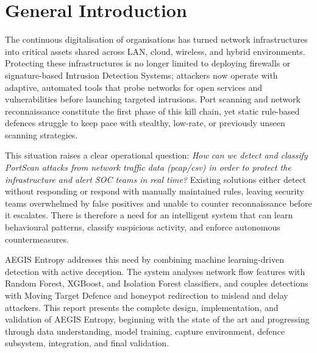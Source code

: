 \documentclass[12pt,a4paper]{report}
\begin{document}
\tableofcontents
\listoffigures
\listoftables
\newpage

\section*{General Introduction}

The continuous digitalisation of organisations has turned network infrastructures into critical assets shared across LAN, cloud, wireless, and hybrid environments. Protecting these infrastructures is no longer limited to deploying firewalls or signature-based Intrusion Detection Systems; attackers now operate with adaptive, automated tools that probe networks for open services and vulnerabilities before launching targeted intrusions. Port scanning and network reconnaissance constitute the first phase of this kill chain, yet static rule-based defences struggle to keep pace with stealthy, low-rate, or previously unseen scanning strategies.

This situation raises a clear operational question: \textit{How can we detect and classify PortScan attacks from network traffic data (pcap/csv) in order to protect the infrastructure and alert SOC teams in real time?} Existing solutions either detect without responding or respond with manually maintained rules, leaving security teams overwhelmed by false positives and unable to counter reconnaissance before it escalates. There is therefore a need for an intelligent system that can learn behavioural patterns, classify suspicious activity, and enforce autonomous countermeasures.

AEGIS Entropy addresses this need by combining machine learning-driven detection with active deception. The system analyses network flow features with Random Forest, XGBoost, and Isolation Forest classifiers, and couples detections with Moving Target Defence and honeypot redirection to mislead and delay attackers. This report presents the complete design, implementation, and validation of AEGIS Entropy, beginning with the state of the art and progressing through data understanding, model training, capture environment, defence subsystem, integration, and final validation.


\end{document}
